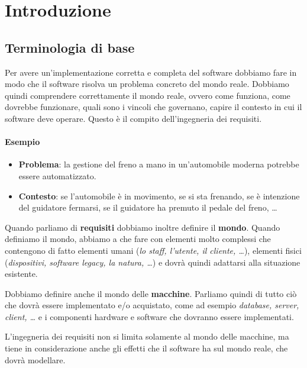 \chapter{Introduzione}
\section{Terminologia di base}
Per avere un'implementazione corretta e completa del software dobbiamo fare 
in modo che il software risolva un problema concreto del mondo reale. Dobbiamo quindi 
comprendere correttamente il mondo reale, ovvero come funziona, come dovrebbe 
funzionare, quali sono i vincoli che governano, capire il contesto in cui il
software deve operare. Questo è il compito dell'ingegneria dei requisiti.

\subsubsection{Esempio}
\begin{itemize}
        \item \textbf{Problema}: la gestione del freno a mano in un'automobile 
        moderna potrebbe essere automatizzato.
        \item \textbf{Contesto}: se l'automobile è in movimento, 
        se si sta frenando, se è intenzione del guidatore fermarsi,
        se il guidatore ha premuto il pedale del freno, \dots
\end{itemize}

Quando parliamo di \textbf{requisiti} dobbiamo inoltre definire il 
\textbf{mondo}. Quando definiamo il mondo, abbiamo a che fare con elementi molto 
complessi che contengono di fatto elementi umani (\textit{lo staff, 
l'utente, il cliente, \dots}), elementi fisici (\textit{dispositivi, 
software legacy, la natura, \dots}) e dovrà quindi adattarsi alla situazione 
esistente.

Dobbiamo definire anche il mondo delle \textbf{macchine}. Parliamo 
quindi di tutto ciò che dovrà essere implementato e/o acquistato, come ad esempio
\textit{database, server, client, \dots} e i componenti 
hardware e software che dovranno essere implementati.

L'ingegneria dei requisiti non si limita solamente al mondo delle 
macchine, ma tiene in considerazione anche gli effetti che il 
software ha sul mondo reale, che dovrà modellare. 

